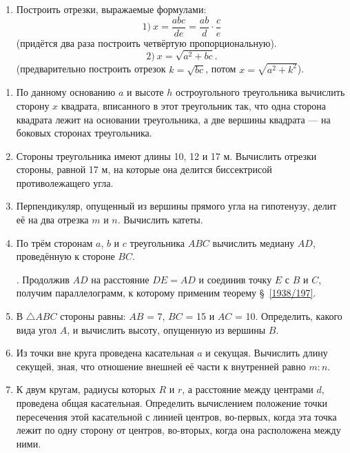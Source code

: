 \documentclass[oneside]{book}
\begin{document}
\begin{enumerate}[resume]
 \item
Построить отрезки, выражаемые формулами: 
\[1)\ x=\frac{abc}{de}=\frac{ab}{d}\cdot \frac{c}{e}\]
(придётся два раза построить четвёртую пропорциональную).
\[2)\ x=\sqrt{a^2+bc}.\]
(предварительно построить отрезок $k=\sqrt{bc}$, потом $x=\sqrt{a^2+k^2}$).

\end{enumerate}

\begin{center}
\end{center}

\begin{enumerate}[resume]

 \item
По данному основанию $a$ и высоте $h$ остроугольного треугольника вычислить сторону $x$ квадрата, вписанного в этот треугольник так, что одна сторона квадрата лежит на основании треугольника, а две вершины квадрата — на боковых сторонах треугольника.

 \item
Стороны треугольника имеют длины 10, 12 и 17 м.
Вычислить отрезки стороны, равной 17 м, на которые она делится биссектрисой противолежащего угла.

 \item
Перпендикуляр, опущенный из вершины прямого угла на гипотенузу, делит её на два отрезка $m$ и $n$.
Вычислить катеты.

 \item
По трём сторонам $a$, $b$ и $c$ треугольника $ABC$ вычислить медиану $AD$, проведённую к стороне $BC$.

\smallskip
{}.
Продолжив $AD$ на расстояние $DE=AD$ и соединив точку $E$ с $B$ и $C$, получим параллелограмм, к которому применим теорему §~\ref{1938/197}.

 \item
В $\triangle ABC$ стороны равны:
$AB$ = 7, $BC$ = 15 и $AC$ = 10.
Определить, какого вида угол $A$, и вычислить высоту, опущенную из вершины $B$.

 \item
Из точки вне круга проведена касательная $a$ и секущая.
Вычислить длину секущей, зная, что отношение внешней её части к внутренней равно $m:n$.

\item
К двум кругам, радиусы которых $R$ и $r$, а расстояние между центрами $d$, проведена общая касательная.
Определить вычислением положение точки пересечения этой касательной с линией центров, во-первых, когда эта точка лежит по одну сторону от центров, во-вторых, когда она расположена между ними.

\end{enumerate}
\end{document}
